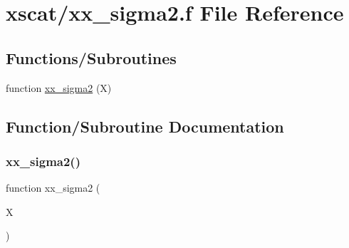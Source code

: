 \hypertarget{xx__sigma2_8f}{}\section{xscat/xx\+\_\+sigma2.f File Reference}
\label{xx__sigma2_8f}
\subsection*{Functions/\+Subroutines}
\begin{DoxyCompactItemize}
\item 
function \hyperlink{xx__sigma2_8f_a63e3040ad6e2ee92c8fab55f5d4c05c1}{xx\+\_\+sigma2} (X)
\end{DoxyCompactItemize}


\subsection{Function/\+Subroutine Documentation}
\mbox{\label{xx__sigma2_8f_a63e3040ad6e2ee92c8fab55f5d4c05c1}} 
\subsubsection{\texorpdfstring{xx\+\_\+sigma2()}{xx\_sigma2()}}
{\footnotesize\ttfamily function xx\+\_\+sigma2 (\begin{DoxyParamCaption}\item[{}]{X }\end{DoxyParamCaption})}

